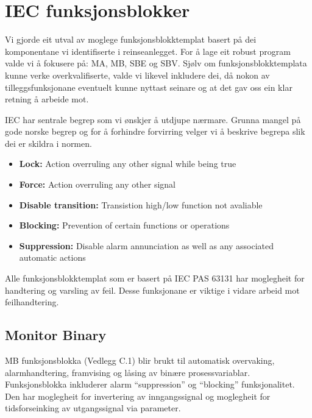 \section{IEC funksjonsblokker} \label{IEC Seksjon}
\thispagestyle{fancy}

Vi gjorde eit utval av moglege funksjonsblokktemplat basert på dei komponentane vi identifiserte i reinseanlegget.
For å lage eit robust program valde vi å fokusere på: \gls{MA}, \gls{MB}, \gls{SBE} og \gls{SBV}.
Sjølv om funksjonsblokktemplata kunne verke overkvalifiserte, valde vi likevel inkludere dei, då nokon av tilleggsfunksjonane eventuelt kunne nyttast seinare
og at det gav oss ein klar retning å arbeide mot.

\gls{IEC} har sentrale begrep som vi ønskjer å utdjupe nærmare. Grunna mangel på gode norske begrep
og for å forhindre forvirring velger vi å beskrive begrepa slik dei er skildra i normen.

\begin{itemize}
    \item \textbf{Lock:} Action overruling any other signal while being true
    \item \textbf{Force:} Action overruling any other signal
    \item \textbf{Disable transition:} Transistion high/low function not avaliable
    \item \textbf{Blocking:} Prevention of certain functions or operations 
    \item \textbf{Suppression:} Disable alarm annunciation as well as any associated automatic actions
\end{itemize}

Alle funksjonsblokktemplat som er basert på \gls{IEC} \gls{PAS} 63131 har moglegheit for handtering og varsling av feil. 
Desse funksjonane er viktige i vidare arbeid mot feilhandtering.


\newpage

\subsection{Monitor Binary}
\gls{MB} funksjonsblokka (Vedlegg C.1) blir brukt til automatisk overvaking, alarmhandtering, framvising og låsing av binære prosessvariablar.
Funksjonsblokka inkluderer alarm ``suppression'' og ``blocking'' funksjonalitet. Den har moglegheit for invertering av 
inngangssignal og moglegheit for tidsforseinking av utgangssignal via parameter.

